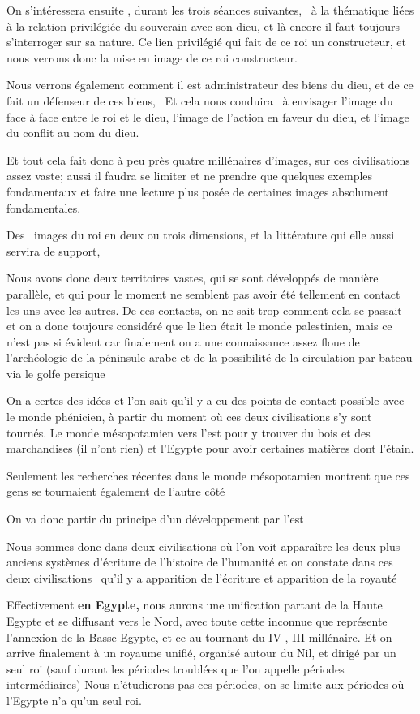 \documentclass[a4paper]{article}
\begin{document}
On s'intéressera ensuite , durant les trois séances suivantes, \ à la thématique liées à la relation privilégiée du
souverain avec son dieu, et là encore il faut toujours s'interroger sur sa nature. Ce lien privilégié qui fait de ce
roi un constructeur, et nous verrons donc la mise en image de ce roi constructeur.

Nous verrons également comment il est administrateur des biens du dieu, et de ce fait un défenseur de ces biens, \ Et
cela nous conduira \ à envisager l'image du face à face entre le roi et le dieu, l'image de l'action en faveur du
dieu, et l'image du conflit au nom du dieu.


Et tout cela fait donc à peu près quatre millénaires d'images, sur ces civilisations assez vaste; aussi il faudra se
limiter et ne prendre que quelques exemples fondamentaux et faire une lecture plus posée de certaines images absolument
fondamentales.

Des \ images du roi en deux ou trois dimensions, et la littérature qui elle aussi servira de support, 


Nous avons donc deux territoires vastes, qui se sont développés de manière parallèle, et qui pour le moment ne semblent
pas avoir été tellement en contact les uns avec les autres. De ces contacts, on ne sait trop comment cela se passait et
on a donc toujours considéré que le lien était le monde palestinien, mais ce n'est pas si évident car finalement on a
une connaissance assez floue de l'archéologie de la péninsule arabe et de la possibilité de la circulation par bateau
via le golfe persique

On a certes des idées et l'on sait qu'il y a eu des points de contact possible avec le monde phénicien, à partir du
moment où ces deux civilisations s'y sont tournés. Le monde mésopotamien vers l'est pour y trouver du bois et des
marchandises (il n'ont rien) et l'Egypte pour avoir certaines matières dont l'étain.

Seulement les recherches récentes dans le monde mésopotamien montrent que ces gens se tournaient également de l'autre
côté


On va donc partir du principe d'un développement par l'est

Nous sommes donc dans deux civilisations où l'on voit apparaître les deux plus anciens systèmes d'écriture de l'histoire
de l'humanité et on constate dans ces deux civilisations \ qu'il y a apparition de l'écriture et apparition de la
royauté


Effectivement \textbf{en Egypte,} nous aurons une unification partant de la Haute Egypte et se diffusant vers le Nord,
avec toute cette inconnue que représente l'annexion de la Basse Egypte, et ce au tournant du IV , III millénaire. Et on
arrive finalement à un royaume unifié, organisé autour du Nil, et dirigé par un seul roi (sauf durant les périodes
troublées que l'on appelle périodes intermédiaires) Nous n'étudierons pas ces périodes, on se limite aux périodes où
l'Egypte n'a qu'un seul roi.
\end{document}
